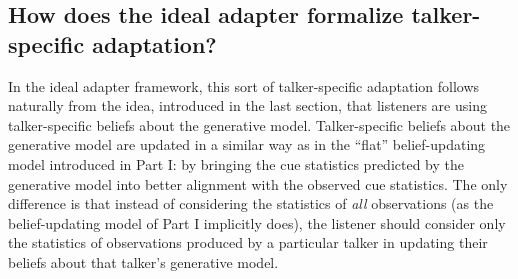 \subsection{How does the ideal adapter formalize talker-specific adaptation?}
\label{sec:how-does-ideal-form-talker-adapt}

In the ideal adapter framework, this sort of talker-specific adaptation follows naturally from the idea, introduced in the last section, that listeners are using talker-specific beliefs about the generative model.  Talker-specific beliefs about the generative model are updated in a similar way as in the ``flat'' belief-updating model introduced in Part I: by bringing the cue statistics predicted by the generative model into better alignment with the observed cue statistics.  The only difference is that instead of considering the statistics of \emph{all} observations (as the belief-updating model of Part I implicitly does), the listener should consider only the statistics of observations produced by a particular talker in updating their beliefs about that talker's generative model.

